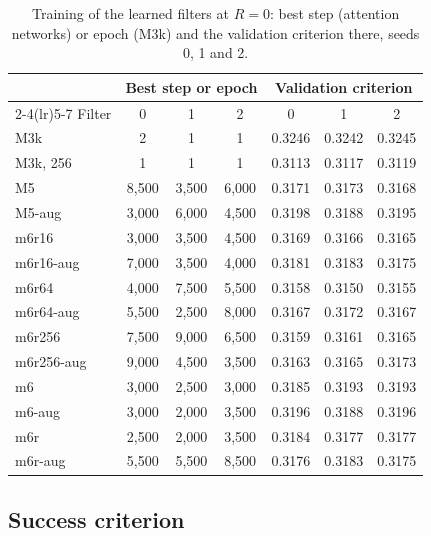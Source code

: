\documentclass[preprint,12pt,authoryear]{elsarticle}
\begin{document}
\begin{table}[tbp]
  \centering
  \footnotesize
  \caption{Training of the learned filters at $R = 0$: best step (attention networks) or epoch (M3k) and the validation criterion there, seeds 0, 1 and 2.}
  \label{tab:training}
  \begin{tabular}{lcccccc}
    \toprule
    & \multicolumn{3}{c}{Best step or epoch} & \multicolumn{3}{c}{Validation criterion} \\
    \cmidrule(lr){2-4}\cmidrule(lr){5-7}
    Filter & 0 & 1 & 2 & 0 & 1 & 2 \\
    \midrule
    M3k & 2 & 1 & 1 & 0.3246 & 0.3242 & 0.3245 \\
    M3k, 256 & 1 & 1 & 1 & 0.3113 & 0.3117 & 0.3119 \\
    M5 & 8,500 & 3,500 & 6,000 & 0.3171 & 0.3173 & 0.3168 \\
    M5-aug & 3,000 & 6,000 & 4,500 & 0.3198 & 0.3188 & 0.3195 \\
    m6r16 & 3,000 & 3,500 & 4,500 & 0.3169 & 0.3166 & 0.3165 \\
    m6r16-aug & 7,000 & 3,500 & 4,000 & 0.3181 & 0.3183 & 0.3175 \\
    m6r64 & 4,000 & 7,500 & 5,500 & 0.3158 & 0.3150 & 0.3155 \\
    m6r64-aug & 5,500 & 2,500 & 8,000 & 0.3167 & 0.3172 & 0.3167 \\
    m6r256 & 7,500 & 9,000 & 6,500 & 0.3159 & 0.3161 & 0.3165 \\
    m6r256-aug & 9,000 & 4,500 & 3,500 & 0.3163 & 0.3165 & 0.3173 \\
    m6 & 3,000 & 2,500 & 3,000 & 0.3185 & 0.3193 & 0.3193 \\
    m6-aug & 3,000 & 2,000 & 3,500 & 0.3196 & 0.3188 & 0.3196 \\
    m6r & 2,500 & 2,000 & 3,500 & 0.3184 & 0.3177 & 0.3177 \\
    m6r-aug & 5,500 & 5,500 & 8,500 & 0.3176 & 0.3183 & 0.3175 \\
    \bottomrule
  \end{tabular}
\end{table}

\subsection{Success criterion}
\label{sec:res-criterion}
\end{document}
